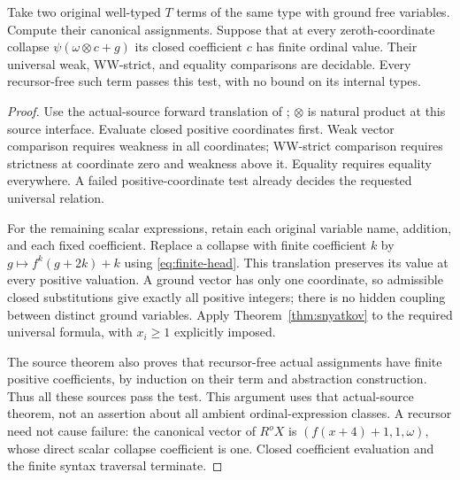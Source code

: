 \documentclass[11pt]{article}
\begin{document}
\begin{theorem}\label{thm:finite-source}
Take two original well-typed $T$ terms of the same type with ground free
variables. Compute their canonical assignments. Suppose that at every
zeroth-coordinate collapse $\psi(\omega\otimes c+g)$ its closed coefficient
$c$ has finite ordinal value. Their universal weak, WW-strict, and equality
comparisons are decidable. Every recursor-free such term passes this test,
with no bound on its internal types.
\end{theorem}
\begin{proof}
Use the actual-source forward translation of \cite{wwfoundations};
$\otimes$ is natural product at this source interface. Evaluate closed
positive coordinates first. Weak vector comparison requires weakness in
all coordinates; WW-strict comparison requires strictness at coordinate
zero and weakness above it. Equality requires equality everywhere. A failed
positive-coordinate test already decides the requested universal relation.

For the remaining scalar expressions, retain each original variable name,
addition, and each fixed coefficient. Replace a collapse with finite
coefficient $k$ by $g\mapsto f^k(g+2k)+k$ using
\eqref{eq:finite-head}. This translation preserves its value at every
positive valuation. A ground vector has only one coordinate, so admissible
closed substitutions give exactly all positive integers; there is no hidden
coupling between distinct ground variables. Apply Theorem~\ref{thm:snyatkov}
to the required universal formula, with $x_i\ge1$ explicitly imposed.

The source theorem also proves that recursor-free actual assignments have
finite positive coefficients, by induction on their term and abstraction
construction. Thus all these sources pass the test. This argument uses that
actual-source theorem, not an assertion about all ambient ordinal-expression
classes. A recursor need not cause failure: the canonical vector of $R^oX$
is $(f(x+4)+1,1,\omega)$, whose direct scalar collapse coefficient is one.
Closed coefficient evaluation and the finite syntax traversal terminate.
\end{proof}
\end{document}
